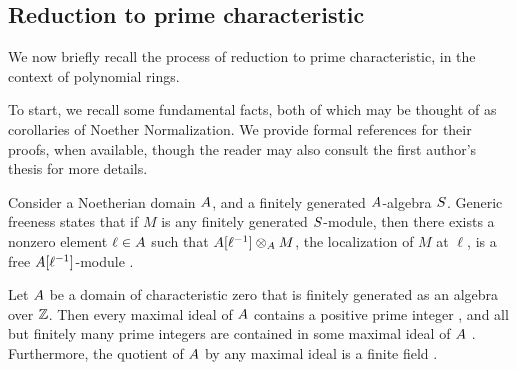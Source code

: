 \documentclass{article}
\begin{document}
\subsection{Reduction to prime characteristic}

We now briefly recall the process of reduction to prime characteristic, in the context of polynomial rings.

To start, we recall some fundamental facts, both of which may be thought of as corollaries of Noether Normalization.
We provide formal references for their proofs, when available, though the reader may also consult the first author's thesis \cite[Chapter~3]{hernandez.thesis} for more details.

\begin{remark}\label{generic-freeness}
   Consider a Noetherian domain $A$, and a finitely generated $A$-algebra $S$.
   Generic freeness states that if $M$ is any finitely generated $S$-module, then there exists a nonzero element  $\ell \in A$ such that $A[\ell^{-1}] \otimes_A M$, the localization of $M$ at $\ell$, is a free $A[\ell^{-1}]$-module \cite[Theorem~24.1]{matsumura}.
\end{remark}

\begin{remark}
   \label{maximal ideals: R}
   Let $A$ be a domain of characteristic zero that is finitely generated as an algebra over $\mathbb{Z}$.
   Then every maximal ideal of $A$ contains a positive prime integer \cite[V.3.4, Theorem~3(ii)]{bourbaki.commalg},
    and all but finitely many prime integers are contained in some maximal ideal of $A$ \cite[Corollary~3.2]{hernandez.thesis}.
   Furthermore, the quotient of $A$ by any maximal ideal is a finite field \cite[V.3.4, Corollary~1]{bourbaki.commalg}.
\end{remark}
\end{document}
